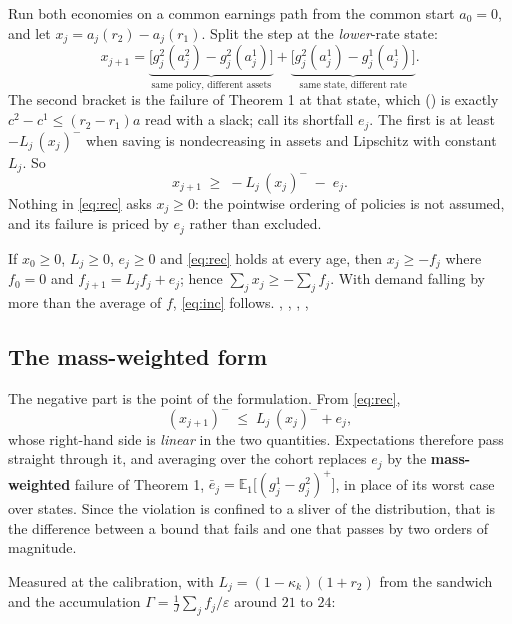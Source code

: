 Run both economies on a common earnings path from the common start $a_0=0$, and let
$x_j=a_j(r_2)-a_j(r_1)$. Split the step at the \emph{lower}-rate state:
\[
  x_{j+1}=\underbrace{\bigl[g^2_j(a^2_j)-g^2_j(a^1_j)\bigr]}_{\text{same policy, different assets}}
   +\underbrace{\bigl[g^2_j(a^1_j)-g^1_j(a^1_j)\bigr]}_{\text{same state, different rate}} .
\]
The second bracket is the failure of Theorem 1 at that state, which
() is exactly $c^2-c^1\le(r_2-r_1)a$ read with a slack;
call its shortfall $e_j$. The first is at least $-L_j\,(x_j)^-$ when saving is nondecreasing in
assets and Lipschitz with constant $L_j$. So
\begin{equation}\label{eq:rec}
  x_{j+1}\;\ge\;-L_j\,(x_j)^-\;-\;e_j .
  \tag{$\ast$}
\end{equation}
Nothing in \eqref{eq:rec} asks $x_j\ge0$: the pointwise ordering of policies is not assumed, and its
failure is priced by $e_j$ rather than excluded.

\begin{theorem}\label{thm:envelope}
If $x_0\ge0$, $L_j\ge0$, $e_j\ge0$ and \eqref{eq:rec} holds at every age, then $x_j\ge-f_j$ where
$f_0=0$ and $f_{j+1}=L_jf_j+e_j$; hence $\sum_jx_j\ge-\sum_jf_j$. With demand falling by more than
the average of $f$, \eqref{eq:inc} follows.
, , ,
, 
\end{theorem}

\subsection{The mass-weighted form}

The negative part is the point of the formulation. From \eqref{eq:rec},
\[
  (x_{j+1})^-\;\le\;L_j\,(x_j)^-+e_j ,
\]
whose right-hand side is \emph{linear} in the two quantities. Expectations therefore pass straight
through it, and averaging over the cohort replaces $e_j$ by the \textbf{mass-weighted} failure of
Theorem 1, $\bar e_j=\mathbb E_{1}\bigl[(g^1_j-g^2_j)^+\bigr]$, in place of its worst case over
states. Since the violation is confined to a sliver of the distribution, that is the difference
between a bound that fails and one that passes by two orders of magnitude.

Measured at the calibration, with $L_j=(1-\kappa_k)(1+r_2)$ from the sandwich and the accumulation
$\Gamma=\frac1J\sum_jf_j/\varepsilon$ around $21$ to $24$:

